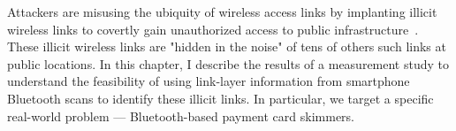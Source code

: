 
%
%
% 
Attackers are misusing the ubiquity of wireless access links by implanting illicit wireless links to covertly gain unauthorized access to public infrastructure~\cite{arizona-2018,florida-2018}.
%
These illicit wireless links are "hidden in the noise" of tens of others such links at public locations.
%
In this chapter, I describe the results of a measurement study to understand the feasibility of using link-layer information from smartphone Bluetooth scans to identify these illicit links.
%
In particular, we target a specific real-world problem --- Bluetooth-based payment card skimmers.
%
